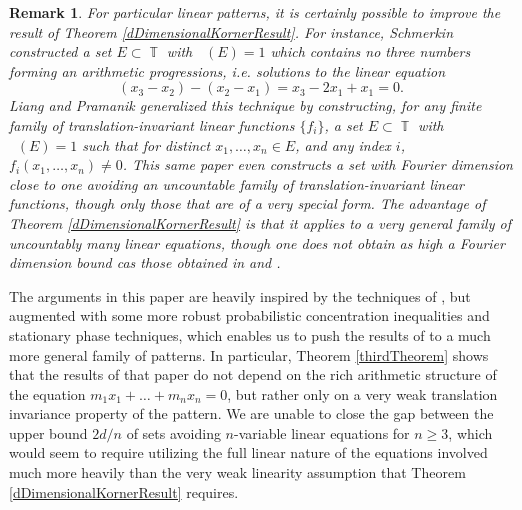 \documentclass[dvipsnames,letterpaper,12pt]{article}
\numberwithin{equation}{section}
\DeclareMathOperator{\fordim}{\dim_{\mathbb{F}}}
\DeclareMathOperator{\TT}{\mathbb{T}}
\newtheorem{remark}[theorem]{Remark}
\numberwithin{theorem}{section}
\begin{document}
\begin{remark}
    For \emph{particular} linear patterns, it is certainly possible to improve the result of Theorem \ref{dDimensionalKornerResult}. For instance, Schmerkin \cite{Schmerkin} constructed a set $E \subset \TT$ with $\fordim(E) = 1$ which contains no three numbers forming an arithmetic progressions, i.e. solutions to the linear equation
    \[ (x_3 - x_2) - (x_2 - x_1) = x_3 - 2x_1 + x_1 = 0. \]
    Liang and Pramanik \cite{LiangPramanik} generalized this technique by constructing, for any finite family of translation-invariant linear functions $\{ f_i \}$, a set $E \subset \TT$ with $\fordim(E) = 1$ such that for distinct $x_1,\dots,x_n \in E$, and any index $i$, $f_i(x_1,\dots,x_n) \neq 0$. This same paper even constructs a set with Fourier dimension close to one avoiding an uncountable family of translation-invariant linear functions, though only those that are of a very special form. The advantage of Theorem \ref{dDimensionalKornerResult} is that it applies to a very general family of uncountably many linear equations, though one does not obtain as high a Fourier dimension bound cas those obtained in \cite{LiangPramanik} and \cite{Schmerkin}.
\end{remark}

The arguments in this paper are heavily inspired by the techniques of \cite{Korner2}, but augmented with some more robust probabilistic concentration inequalities and stationary phase techniques, which enables us to push the results of \cite{Korner2} to a much more general family of patterns. In particular, Theorem \ref{thirdTheorem} shows that the results of that paper do not depend on the rich arithmetic structure of the equation $m_1x_1 + \dots + m_nx_n = 0$, but rather only on a very weak translation invariance property of the pattern. We are unable to close the gap between the upper bound $2d/n$ of sets avoiding $n$-variable linear equations for $n \geq 3$, which would seem to require utilizing the full linear nature of the equations involved much more heavily than the very weak linearity assumption that Theorem \ref{dDimensionalKornerResult} requires.

\end{document}
